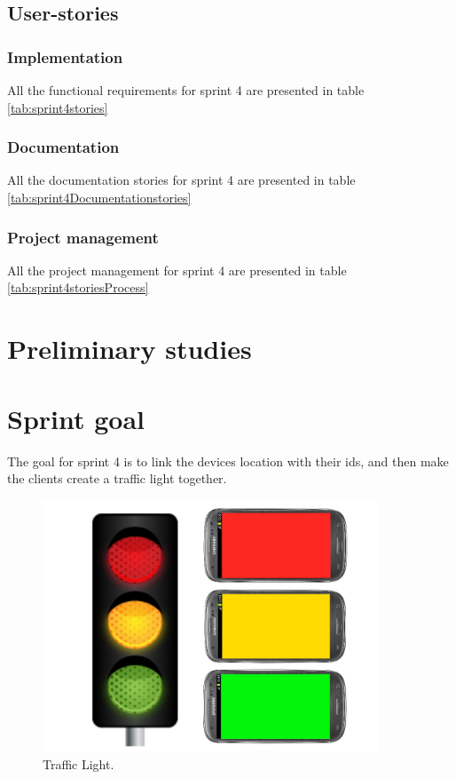 \subsection{User-stories}
\subsubsection*{Implementation}
All the functional requirements for sprint 4 are presented in table \ref{tab:sprint4stories}

\subsubsection*{Documentation}
All the documentation stories for sprint 4 are presented in table \ref{tab:sprint4Documentationstories}

\subsubsection*{Project management}
All the project management for sprint 4 are presented in table \ref{tab:sprint4storiesProcess}

\section{Preliminary studies}
\section{Sprint goal}

The goal for sprint 4 is to link the devices location with their ids, and then make the clients create a traffic light together. 
\begin{figure}[H]
	\centering
		\includegraphics[width=10cm]{sprint4/trafficlight.png}
	\caption{Traffic Light.}
	\label{fig:trafficlight }
\end{figure}

